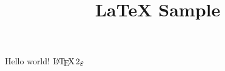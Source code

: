 \documentclass{article}
\title{LaTeX Sample}
\begin{document}
  Hello world!
  $\LaTeXe$
\end{document}
